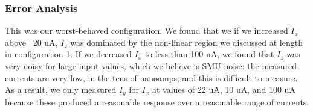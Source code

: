 \documentclass{article}
\begin{document}
\subsubsection*{Error Analysis}

This was our worst-behaved configuration.  We found that we if we increased $I_x$ above ~20 uA, $I_z$ was dominated by the non-linear region we discussed at length in configuration 1.  If we decreased $I_x$ to less than 100 uA, we found that $I_z$ was very noisy for large input values, which we believe is SMU noise: the measured currents are very low, in the tens of nanoamps, and this is difficult to measure.  As a result, we only measured $I_y$ for $I_x$ at values of 22 uA, 10 uA, and 100 uA because these produced a reasonable response over a reasonable range of currents.
\end{document}
